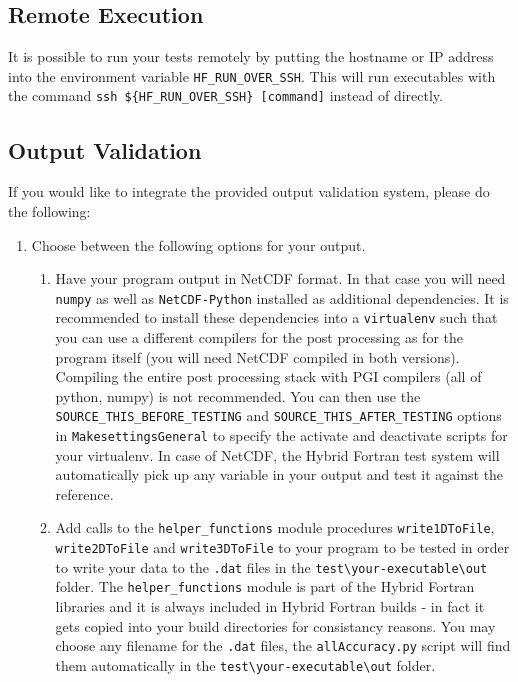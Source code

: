 \subsection{Remote Execution}
It is possible to run your tests remotely by putting the hostname or IP address into the environment variable \verb|HF_RUN_OVER_SSH|. This will run executables with the command \verb|ssh ${HF_RUN_OVER_SSH} [command]| instead of directly.

\subsection{Output Validation} \label{sub:testIntegration}
If you would like to integrate the provided output validation system, please do the following:
\begin{enumerate}
  \item \label{enum:writeProc} Choose between the following options for your output.
    \begin{enumerate}
      \item Have your program output in NetCDF format. In that case you will need \verb|numpy| as well as \verb|NetCDF-Python| installed as additional dependencies. It is recommended to install these dependencies into a \verb|virtualenv| such that you can use a different compilers for the post processing as for the program itself (you will need NetCDF compiled in both versions). Compiling the entire post processing stack with PGI compilers (all of python, numpy) is not recommended. You can then use the \verb|SOURCE_THIS_BEFORE_TESTING| and \verb|SOURCE_THIS_AFTER_TESTING| options in \verb|MakesettingsGeneral| to specify the activate and deactivate scripts for your virtualenv. In case of NetCDF, the Hybrid Fortran test system will automatically pick up any variable in your output and test it against the reference.
      \item Add calls to the \verb|helper_functions| module procedures \verb|write1DToFile|, \verb|write2DToFile| and \verb|write3DToFile| to your program to be tested in order to write your data to the \verb|.dat| files in the \verb|test\your-executable\out| folder. The \verb|helper_functions| module is part of the Hybrid Fortran libraries and it is always included in Hybrid Fortran builds - in fact it gets copied into your build directories for consistancy reasons. You may choose any filename for the \verb|.dat| files, the \verb|allAccuracy.py| script will find them automatically in the \verb|test\your-executable\out| folder.
    \end{enumerate}

\end{enumerate}
